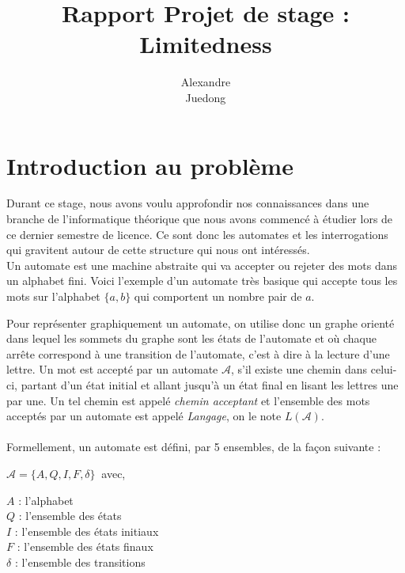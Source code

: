 \documentclass{report}
\title{\textbf{Rapport Projet de stage : Limitedness}}
\author{
\bsc {Brebant} Alexandre\\
\bsc {Xue} Juedong}
\begin{document}
\maketitle

\newcommand{\Aut}{\mathcal{A}}
\newcommand{\Ref}{\Aut_{ref}}
\newcommand{\N}{\mathbb{N}}

\tableofcontents
\chapter{Introduction au problème}
Durant ce stage, nous avons voulu approfondir nos connaissances dans une branche de l'informatique théorique que nous avons commencé à étudier lors de ce dernier semestre de licence. Ce sont donc les automates et les interrogations qui gravitent autour de cette structure qui nous ont intéressés.\\
Un automate est une machine abstraite qui va accepter ou rejeter des mots dans un alphabet fini. 
Voici l'exemple d'un automate très basique qui accepte tous les mots sur l'alphabet $\{a, b\}$ qui comportent un nombre pair de $a$.
\begin{center}
\end{center}

Pour représenter graphiquement un automate, on utilise donc un graphe orienté dans lequel les sommets du graphe sont les états de l'automate et où chaque arrête correspond à une transition de l'automate, c'est à dire à la lecture d'une lettre. Un mot est accepté par un automate $\Aut$, s'il existe une chemin dans celui-ci, partant d'un état initial et allant jusqu'à un état final en lisant les lettres une par une. Un tel chemin est appelé \textit{chemin acceptant} et l'ensemble des mots acceptés par un automate est appelé \textit{Langage}, on le note $L(\Aut)$.\\\\
Formellement, un automate est défini, par 5 ensembles, de la façon suivante :
\begin{center}
 $ \Aut = \{ A, Q, I, F, \delta \}\ $     avec,
 \end{center}
$A$ : l’alphabet\\
$Q$ : l'ensemble des états\\
$I$ : l'ensemble des états initiaux\\
$F$ : l'ensemble des états finaux\\
$\delta$ : l'ensemble des transitions\\
\end{document}
